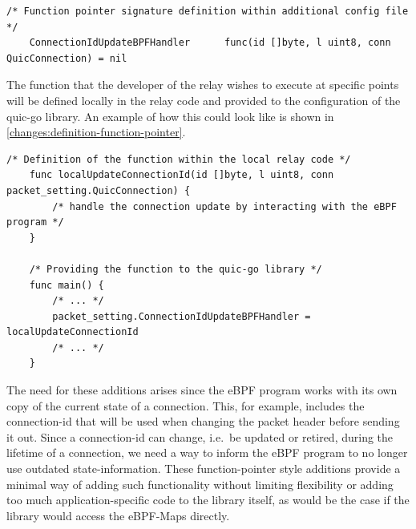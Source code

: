 \vspace{0.5cm}
\noindent\begin{minipage}{\textwidth}
\begin{lstlisting}[style=GoStyle, label=changes:signature-function-pointer, caption=Only the signature will be defined within the library itself.]
    /* Function pointer signature definition within additional config file */
	ConnectionIdUpdateBPFHandler      func(id []byte, l uint8, conn QuicConnection) = nil
\end{lstlisting}
\end{minipage}

The function that the developer of the relay wishes to execute at specific points will be defined 
locally in the relay code and provided to the configuration of the quic-go library.
An example of how this could look like is shown in \autoref{changes:definition-function-pointer}.

\vspace{0.5cm}
\noindent\begin{minipage}{\textwidth}
\begin{lstlisting}[style=GoStyle, label=changes:definition-function-pointer, caption=An example of how the addition looks on the relay side.]
    /* Definition of the function within the local relay code */
    func localUpdateConnectionId(id []byte, l uint8, conn packet_setting.QuicConnection) {
        /* handle the connection update by interacting with the eBPF program */
    }   

    /* Providing the function to the quic-go library */
    func main() {
        /* ... */
        packet_setting.ConnectionIdUpdateBPFHandler = localUpdateConnectionId
        /* ... */
    }
\end{lstlisting}
\end{minipage}

The need for these additions arises since the eBPF program works with its own copy of the current state of a connection.
This, for example, includes the connection-id that will be used when changing the packet header before sending it out.
Since a connection-id can change, i.e.~be updated or retired, during the lifetime of a connection, we need a way to inform 
the eBPF program to no longer use outdated state-information.
These function-pointer style additions provide a minimal way of adding such functionality without limiting flexibility 
or adding too much application-specific code to the library itself, as would be the case if the library would access 
the eBPF-Maps directly.


